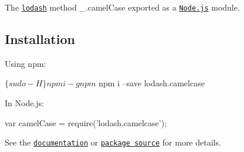 The \href{https://lodash.com/}{\tt lodash} method {\ttfamily \+\_\+.\+camel\+Case} exported as a \href{https://nodejs.org/}{\tt Node.\+js} module.

\subsection*{Installation}

Using npm\+: 
\begin{DoxyCode}
$ \{sudo -H\} npm i -g npm
$ npm i --save lodash.camelcase
\end{DoxyCode}


In Node.\+js\+: 
\begin{DoxyCode}
var camelCase = require('lodash.camelcase');
\end{DoxyCode}


See the \href{https://lodash.com/docs#camelCase}{\tt documentation} or \href{https://github.com/lodash/lodash/blob/4.3.0-npm-packages/lodash.camelcase}{\tt package source} for more details. 